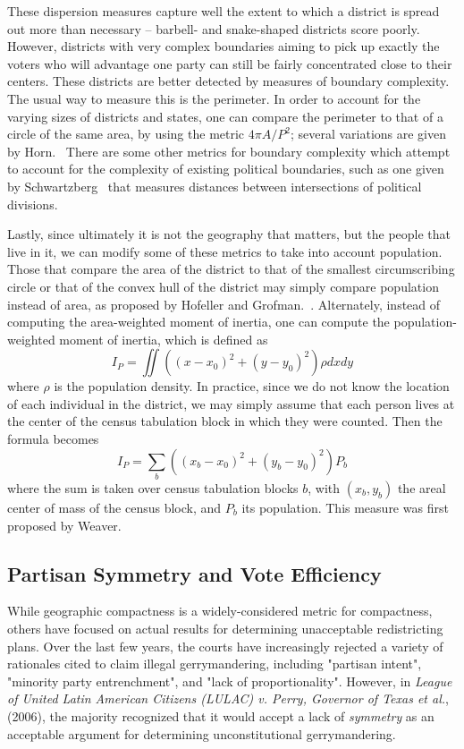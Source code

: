 \documentclass[12pt]{article}
\begin{document}
  These dispersion measures capture well the extent to which a district is spread out more than necessary -- barbell- and snake-shaped districts score poorly.  However, districts with very complex boundaries aiming to pick up exactly the voters who will advantage one party can still be fairly concentrated close to their centers.  These districts are better detected by measures of boundary complexity.  The usual way to measure this is the perimeter.  In order to account for the varying sizes of districts and states, one can compare the perimeter to that of a circle of the same area, by using the metric $4\pi A/P^2$; several variations are given by Horn.~\cite{horn}  There are some other metrics for boundary complexity which attempt to account for the complexity of existing political boundaries, such as one given by Schwartzberg~\cite{schwartzberg} that measures distances between intersections of political divisions.

  Lastly, since ultimately it is not the geography that matters, but the people that live in it, we can modify some of these metrics to take into account population.  Those that compare the area of the district to that of the smallest circumscribing circle or that of the convex hull of the district may simply compare population instead of area, as proposed by Hofeller and Grofman.~\cite{hofeller}.  Alternately, instead of computing the area-weighted moment of inertia, one can compute the population-weighted moment of inertia, which is defined as
  \[I_P = \iint ((x-x_0)^2 + (y-y_0)^2) \rho dx dy \]
  where $\rho$ is the population density.  In practice, since we do not know the location of each individual in the district, we may simply assume that each person lives at the center of the census tabulation block in which they were counted.  Then the formula becomes
  \[I_P = \sum_{b} ((x_b-x_0)^2 + (y_b-y_0)^2) P_b\]
  where the sum is taken over census tabulation blocks $b$, with $(x_b, y_b)$ the areal center of mass of the census block, and $P_b$ its population.  This measure was first proposed by Weaver.~\cite{weaver}
  
    \subsection{Partisan Symmetry and Vote Efficiency}
 While geographic compactness is a widely-considered metric for compactness, others have focused on actual results for determining unacceptable redistricting plans.  Over the last few years, the courts have increasingly rejected a variety of rationales cited to claim illegal gerrymandering, including "partisan intent",  "minority party entrenchment", and "lack of proportionality".  However, in \textit{League of United Latin American Citizens (LULAC) v. Perry, Governor of Texas et al.}, (2006), the majority recognized that it would accept a lack of \textit{symmetry} as an acceptable argument for determining unconstitutional gerrymandering. \\
  
\end{document}
